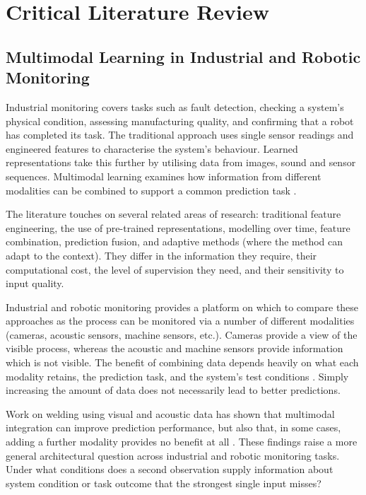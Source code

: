 \chapter{Critical Literature Review}

\label{ch:literature}

\section*{Multimodal Learning in Industrial and Robotic Monitoring}


Industrial monitoring covers tasks such as fault detection, checking a system's physical condition,
assessing manufacturing quality, and confirming that a robot has completed its task. The traditional
approach uses single sensor readings and engineered features to characterise the system's behaviour.
Learned representations take this further by utilising data from images, sound and sensor sequences.
Multimodal learning examines how information from different modalities can be combined to support a
common prediction task \parencite{Baltrusaitis2019Multimodal,Huo2022Multisensor,Thoduka2024Handover}.

The literature touches on several related areas of research: traditional feature engineering, the
use of pre-trained representations, modelling over time, feature combination, prediction fusion, and
adaptive methods (where the method can adapt to the context). They differ in the information they
require, their computational cost, the level of supervision they need, and their sensitivity to
input quality.

Industrial and robotic monitoring provides a platform on which to compare these approaches as the
process can be monitored via a number of different modalities (cameras, acoustic sensors, machine
sensors, etc.). Cameras provide a view of the visible process, whereas the acoustic
and machine sensors provide information which is not visible. The benefit of combining data depends
heavily on what each modality retains, the prediction task, and the
system's test conditions \parencite{Wang2020What,Hua2026Weld,Goodarzi2023Deep}. Simply increasing the
amount of data does not necessarily lead to better predictions.

Work on welding using visual and acoustic data has shown that multimodal integration can improve prediction performance, but also that, in some cases, adding a further modality provides no benefit at all \parencite{P003,Hua2026Weld}. These findings raise a more general architectural question across industrial and robotic monitoring tasks. Under what conditions does a second observation supply information about system condition or task outcome that the strongest single input misses?


